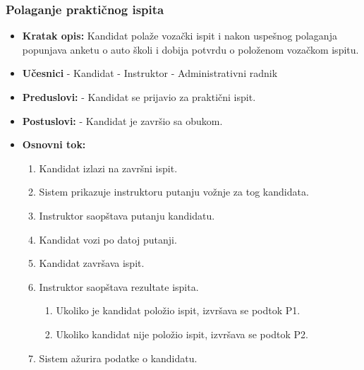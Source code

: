 \subsubsection{Polaganje praktičnog ispita}

\vspace{3mm}

\begin{itemize}

\item \textbf{Kratak opis:} Kandidat polaže vozački ispit i nakon uspešnog polaganja popunjava anketu o auto školi i dobija potvrdu o položenom vozačkom ispitu.

\vspace{2mm}

\item \textbf{Učesnici} \newline
   - Kandidat \newline   
   - Instruktor \newline
   - Administrativni radnik 
   
\item \textbf{Preduslovi:} \newline
   - Kandidat se prijavio za praktični ispit.

\item \textbf{Postuslovi:} \newline
    - Kandidat je završio sa obukom.

\item \textbf{Osnovni tok:}  
   \begin{enumerate}
   \item Kandidat izlazi na završni ispit.
   \item Sistem prikazuje instruktoru putanju vožnje za tog kandidata.
   \item Instruktor saopštava putanju kandidatu.
   \item Kandidat vozi po datoj putanji.
   \item Kandidat završava ispit.
   \item Instruktor saopštava rezultate ispita.
   \begin{enumerate}
       \item Ukoliko je kandidat položio ispit, izvršava se podtok P1.
       \item Ukoliko kandidat nije položio ispit, izvršava se podtok P2.
   \end{enumerate}
   \item Sistem ažurira podatke o kandidatu.     


\end{enumerate}
\end{itemize}
